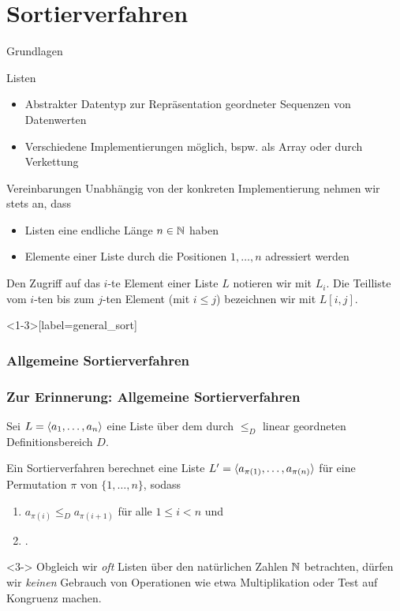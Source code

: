 \section{Sortierverfahren}

\begin{frame}{Grundlagen}
\begin{block}{Listen}
\begin{itemize}
    \item Abstrakter Datentyp zur Repr\"asentation geordneter Sequenzen von Datenwerten
    \item Verschiedene Implementierungen m\"oglich, bspw. als \alert{Array} oder durch \alert{Verkettung}
\end{itemize}
\end{block}

\begin{block}{Vereinbarungen}
Unabh\"angig von der konkreten Implementierung nehmen wir stets an, dass
\begin{itemize}
    \item Listen eine endliche L\"ange $n \in \mathbb{N}$ haben
    \item Elemente einer Liste durch die Positionen $1, \dots, n$ adressiert werden
\end{itemize}
Den Zugriff auf das $i$-te Element einer Liste $L$ notieren wir mit $L_i$.
Die Teilliste vom $i$-ten bis zum $j$-ten Element (mit $i \leq j$) bezeichnen wir mit $L[i, j]$.
\end{block}
\end{frame}

\begin{frame}<1-3>[label=general_sort]
\frametitle<1-3>{Allgemeine Sortierverfahren}
\frametitle<4>{Zur Erinnerung: Allgemeine Sortierverfahren}
\begin{definition}
Sei $L = \langle a_1, \dots, a_n\rangle$ eine Liste \"uber dem durch $\leq_D$ linear geordneten Definitionsbereich $D$.

Ein \alert{ Sortierverfahren} berechnet eine Liste $L' = \langle a_{\pi(1)}, \dots, a_{\pi(n)}\rangle$ f\"ur eine Permutation $\pi$ von $\{ 1, \dots, n\}$, sodass
\begin{enumerate}
    \item $a_{\pi(i)} \leq_D a_{\pi(i+1)}$ f\"ur alle $1 \leq i < n$ und
    \item<2-> .
\end{enumerate}
\end{definition}

\begin{remark}<3->
Obgleich wir \emph{oft} Listen \"uber den nat\"urlichen Zahlen $\mathbb{N}$ betrachten, d\"urfen wir \emph{keinen} Gebrauch von Operationen wie etwa Multiplikation oder Test auf \alert{Kongruenz} machen.
\end{remark}
\pause
\end{frame}

